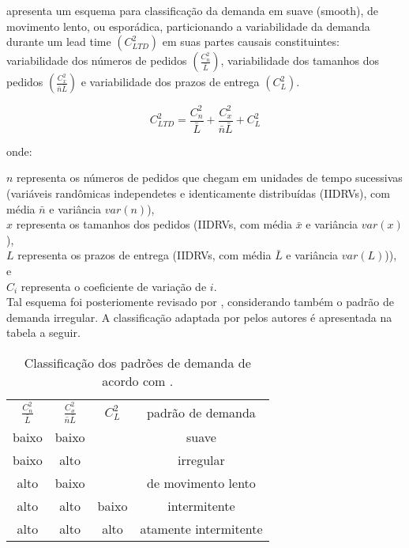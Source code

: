 \documentclass{book}
\begin{document}
\cite{Williams1984} apresenta um esquema para classificação da demanda em suave (smooth), de movimento lento, ou esporádica, particionando a variabilidade da demanda durante um lead time $(C_{LTD}^{2})$ em suas partes causais constituintes: variabilidade dos números de pedidos $(\frac{C_{n}^{2}}{\bar{L}})$, variabilidade dos tamanhos dos pedidos $(\frac{C_{x}^{2}}{\bar{n}\bar{L}})$ e variabilidade dos prazos de entrega $(C_{L}^{2})$. 

\begin{equation}
C_{LTD}^{2} = \frac{C_{n}^{2}}{\bar{L}} + \frac{C_{x}^{2}}{\bar{n}\bar{L}} + C_{L}^{2}
\end{equation}

onde:

$n$ representa os números de pedidos que chegam em unidades de tempo sucessivas (variáveis randômicas independetes e identicamente distribuídas (IIDRVs), com média $\bar{n}$ e variância $var(n)$), \\

$x$ representa os tamanhos dos pedidos (IIDRVs, com média $\bar{x}$ e variância $var(x)$),  \\

$L$ representa os prazos de entrega (IIDRVs, com média $\bar{L}$ e variância $var(L)$)), e \\

$C_{i}$ representa o coeficiente de variação de $i$. \\

Tal esquema foi posteriomente revisado por \cite{EavesKingsman2004}, considerando também o padrão de demanda irregular. A classificação adaptada por pelos autores é apresentada na tabela a seguir.

\begin{table}[h]
\begin{center}
\begin{tabular}[c]{c c c c}
\cline {1-4}
$\frac{C_{n}^{2}}{\bar{L}}$ & $\frac{C_{x}^{2}}{\bar{n}\bar{L}}$ & $C_{L}^{2}$ & padrão de demanda \\ \cline {1-4}
baixo & baixo &  & suave   \\ 
baixo & alto  &  & irregular   \\ 
alto  & baixo &  & de movimento lento   \\
alto  & alto  & baixo & intermitente   \\
alto  & alto  & alto  & atamente intermitente\\ \cline {1-4}
\end{tabular}
\label{tab:DemandPattern}
\caption{Classificação dos padrões de demanda de acordo com \cite{EavesKingsman2004}.}
\end{center}
\end{table}
\end{document}
